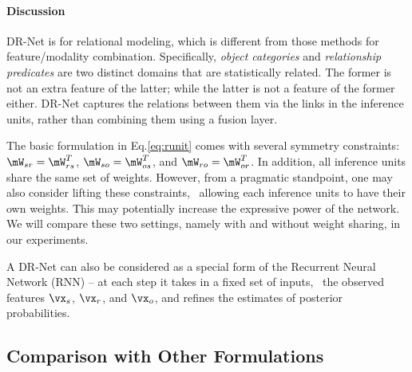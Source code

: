 \documentclass[10pt,twocolumn,letterpaper]{article}
\begin{document}
\paragraph{Discussion}

DR-Net is for relational modeling,
which is different from those methods for feature/modality combination.
Specifically, \emph{object categories} and \emph{relationship predicates} are
two distinct domains that are statistically related. 
The former is not an extra feature of the latter; while the latter is 
not a feature of the former either. 
DR-Net captures the relations between them via the links in the 
inference units, rather than combining them using a fusion layer. 

The basic formulation in Eq.\ref{eq:runit} comes with several symmetry constraints: 
$\mW_{sr} = \mW_{rs}^T$, $\mW_{so} = \mW_{os}^T$, and $\mW_{ro} = \mW_{or}^T$. 
In addition, all inference units share the same set of weights. 
However, from a pragmatic standpoint, one may also consider lifting these constraints,
\eg~allowing each inference units to have their own weights. 
This may potentially increase the expressive power of the network.
We will compare these two settings, namely with and without weight sharing, in our experiments. 

A DR-Net can also be considered as a special form of the Recurrent Neural Network (RNN)
-- at each step it takes in a fixed set of inputs, 
\ie~the observed features $\vx_s$, $\vx_r$, and $\vx_o$, and
refines the estimates of posterior probabilities.

\subsection{Comparison with Other Formulations}%
\end{document}
